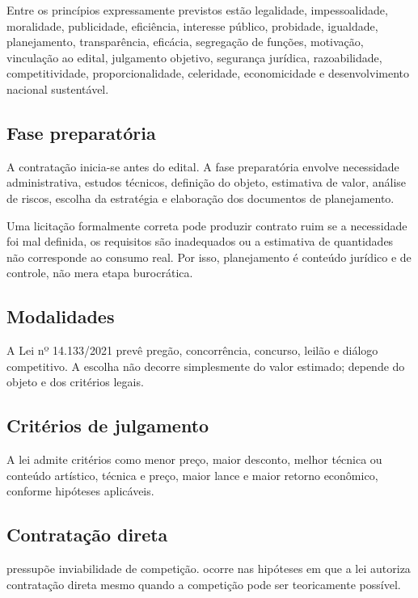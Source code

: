 Entre os princípios expressamente previstos estão legalidade, impessoalidade, moralidade, publicidade, eficiência, interesse público, probidade, igualdade, planejamento, transparência, eficácia, segregação de funções, motivação, vinculação ao edital, julgamento objetivo, segurança jurídica, razoabilidade, competitividade, proporcionalidade, celeridade, economicidade e desenvolvimento nacional sustentável.

\subsection{Fase preparatória}

A contratação inicia-se antes do edital. A fase preparatória envolve necessidade administrativa, estudos técnicos, definição do objeto, estimativa de valor, análise de riscos, escolha da estratégia e elaboração dos documentos de planejamento.

\begin{teoria}
Uma licitação formalmente correta pode produzir contrato ruim se a necessidade foi mal definida, os requisitos são inadequados ou a estimativa de quantidades não corresponde ao consumo real. Por isso, planejamento é conteúdo jurídico e de controle, não mera etapa burocrática.
\end{teoria}

\subsection{Modalidades}

A Lei nº 14.133/2021 prevê pregão, concorrência, concurso, leilão e diálogo competitivo. A escolha não decorre simplesmente do valor estimado; depende do objeto e dos critérios legais.

\subsection{Critérios de julgamento}

A lei admite critérios como menor preço, maior desconto, melhor técnica ou conteúdo artístico, técnica e preço, maior lance e maior retorno econômico, conforme hipóteses aplicáveis.

\subsection{Contratação direta}

 pressupõe inviabilidade de competição.  ocorre nas hipóteses em que a lei autoriza contratação direta mesmo quando a competição pode ser teoricamente possível.

